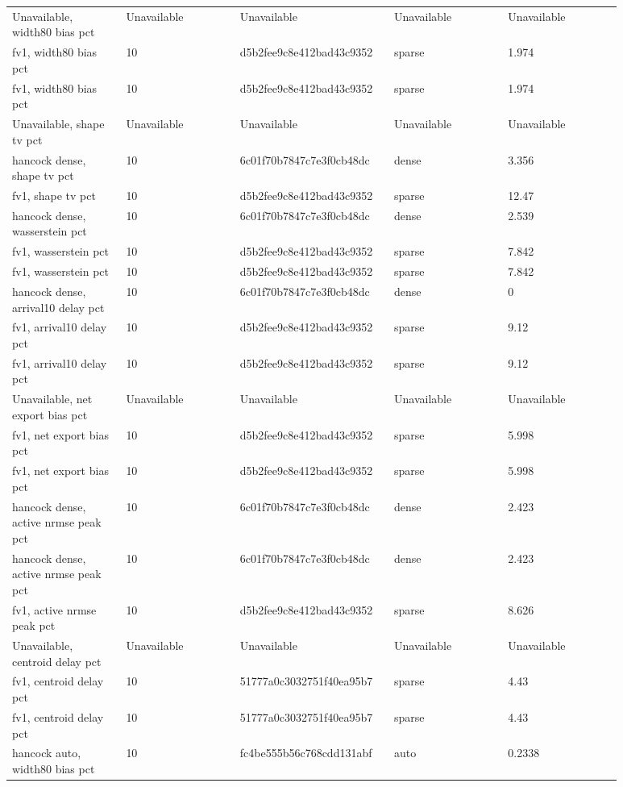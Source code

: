 \begin{longtable}{p{0.1760\linewidth}p{0.1760\linewidth}p{0.1760\linewidth}p{0.1760\linewidth}p{0.1760\linewidth}}
Unavailable, width80 bias pct & Unavailable & Unavailable & Unavailable & Unavailable \\
fv1, width80 bias pct & 10 & d5b2fee9c8e412bad43c9352 & sparse & 1.974 \\
fv1, width80 bias pct & 10 & d5b2fee9c8e412bad43c9352 & sparse & 1.974 \\
Unavailable, shape tv pct & Unavailable & Unavailable & Unavailable & Unavailable \\
hancock dense, shape tv pct & 10 & 6c01f70b7847c7e3f0cb48dc & dense & 3.356 \\
fv1, shape tv pct & 10 & d5b2fee9c8e412bad43c9352 & sparse & 12.47 \\
hancock dense, wasserstein pct & 10 & 6c01f70b7847c7e3f0cb48dc & dense & 2.539 \\
fv1, wasserstein pct & 10 & d5b2fee9c8e412bad43c9352 & sparse & 7.842 \\
fv1, wasserstein pct & 10 & d5b2fee9c8e412bad43c9352 & sparse & 7.842 \\
hancock dense, arrival10 delay pct & 10 & 6c01f70b7847c7e3f0cb48dc & dense & 0 \\
fv1, arrival10 delay pct & 10 & d5b2fee9c8e412bad43c9352 & sparse & 9.12 \\
fv1, arrival10 delay pct & 10 & d5b2fee9c8e412bad43c9352 & sparse & 9.12 \\
Unavailable, net export bias pct & Unavailable & Unavailable & Unavailable & Unavailable \\
fv1, net export bias pct & 10 & d5b2fee9c8e412bad43c9352 & sparse & 5.998 \\
fv1, net export bias pct & 10 & d5b2fee9c8e412bad43c9352 & sparse & 5.998 \\
hancock dense, active nrmse peak pct & 10 & 6c01f70b7847c7e3f0cb48dc & dense & 2.423 \\
hancock dense, active nrmse peak pct & 10 & 6c01f70b7847c7e3f0cb48dc & dense & 2.423 \\
fv1, active nrmse peak pct & 10 & d5b2fee9c8e412bad43c9352 & sparse & 8.626 \\
Unavailable, centroid delay pct & Unavailable & Unavailable & Unavailable & Unavailable \\
fv1, centroid delay pct & 10 & 51777a0c3032751f40ea95b7 & sparse & 4.43 \\
fv1, centroid delay pct & 10 & 51777a0c3032751f40ea95b7 & sparse & 4.43 \\
hancock auto, width80 bias pct & 10 & fc4be555b56c768cdd131abf & auto & 0.2338 \\

\end{longtable}
